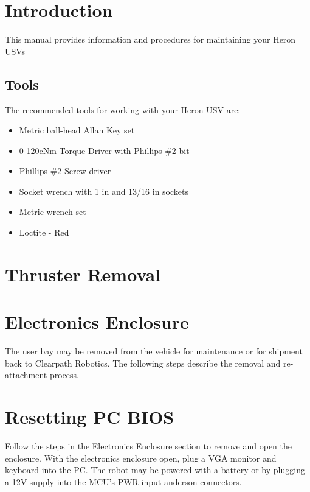 \documentclass[]{clearpath-latex/clearpath-manual}
\begin{document}
\tableofcontents

\section{Introduction}
This manual provides information and procedures for maintaining your Heron USVs

\subsection{Tools}

The recommended tools for working with your Heron USV are:

\begin{itemize}[nolistsep]
	\item Metric ball-head Allan Key set
	\item 0-120cNm Torque Driver with Phillips \#2 bit
	\item Phillips \#2 Screw driver
	\item Socket wrench with 1 in and 13/16 in sockets
	\item Metric wrench set
	\item Loctite - Red
\end{itemize}


\newpage

\section{Thruster Removal}

\section{Electronics Enclosure}

The user bay may be removed from the vehicle for maintenance or for shipment back to Clearpath Robotics. The following steps describe the removal and re-attachment process.

\section{Resetting PC BIOS}

Follow the steps in the Electronics Enclosure section to remove and open the enclosure. With the electronics enclosure open, plug a VGA monitor and keyboard into the PC. The robot may be powered with a battery or by plugging a 12V supply into the MCU's PWR input anderson connectors.
\end{document}
